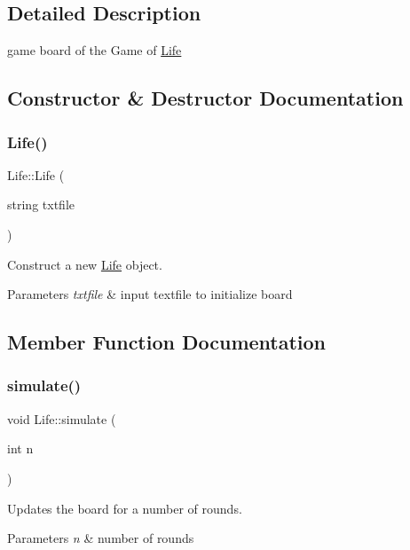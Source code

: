 \subsection{Detailed Description}
game board of the Game of \hyperlink{class_life}{Life} 

\subsection{Constructor \& Destructor Documentation}
\mbox{\label{class_life_ace91fdfb133e871271c6cdb3a01e5438}} 
\subsubsection{\texorpdfstring{Life()}{Life()}}
{\footnotesize\ttfamily Life\+::\+Life (\begin{DoxyParamCaption}\item[{string}]{txtfile }\end{DoxyParamCaption})}



Construct a new \hyperlink{class_life}{Life} object. 


\begin{DoxyParams}{Parameters}
{\em txtfile} & input textfile to initialize board \\
\hline
\end{DoxyParams}


\subsection{Member Function Documentation}
\mbox{\label{class_life_ac71f4324936fa163457e65c9c699bca7}} 
\subsubsection{\texorpdfstring{simulate()}{simulate()}}
{\footnotesize\ttfamily void Life\+::simulate (\begin{DoxyParamCaption}\item[{int}]{n }\end{DoxyParamCaption})}



Updates the board for a number of rounds. 


\begin{DoxyParams}{Parameters}
{\em n} & number of rounds \\
\hline
\end{DoxyParams}
\mbox{\label{class_life_a83a5761ba56c11bd7d559c8206b10b29}} 
